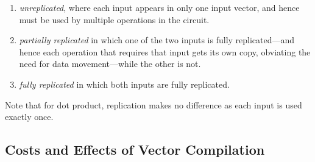\begin{enumerate}[label=(\roman*)]
\item {\em unreplicated}, where each input appears in only one input vector, and hence must be used by multiple operations in the circuit.
\item {\em partially replicated} in which one of the two inputs is fully replicated---and hence each operation that requires that input gets its own copy, obviating the need for data movement---while the other is not.
\item {\em fully replicated} in which both inputs are fully replicated. 
\end{enumerate}
Note that for dot product, replication makes no difference as each input is used exactly once.

\subsection{Costs and Effects of Vector Compilation}\label{sec:compilation-stuff}

